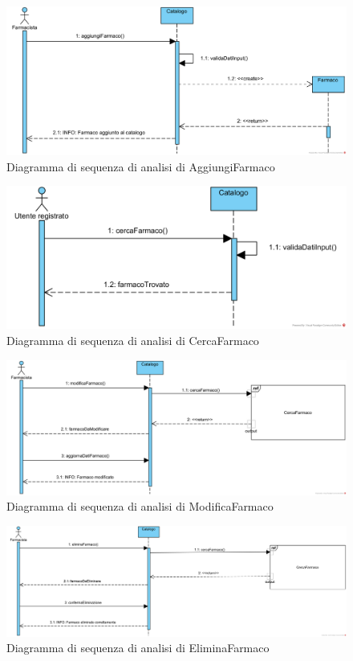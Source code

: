 \begin{figure}[!hbp]
	\centering
	\includegraphics[width=0.8\linewidth]{assets/sequence_analisi/SequenceAnalisiAggiungiFarmaco.png}
	\caption{Diagramma di sequenza di analisi di AggiungiFarmaco}
\end{figure}

\begin{figure}[!hbp]
	\centering
	\includegraphics[width=0.7\linewidth]{assets/sequence_analisi/SequenceAnalisiCercaFarmaco.png}
	\caption{Diagramma di sequenza di analisi di CercaFarmaco}
\end{figure}

\begin{figure}[!hbp]
	\centering
	\includegraphics[width=\linewidth]{assets/sequence_analisi/SequenceAnalisiModificaFarmaco.png}
	\caption{Diagramma di sequenza di analisi di ModificaFarmaco}
\end{figure}

\begin{figure}[!hbp]
	\centering
	\includegraphics[width=\linewidth]{assets/sequence_analisi/SequenceAnalisiEliminaFarmaco.png}
	\caption{Diagramma di sequenza di analisi di EliminaFarmaco}
\end{figure}

